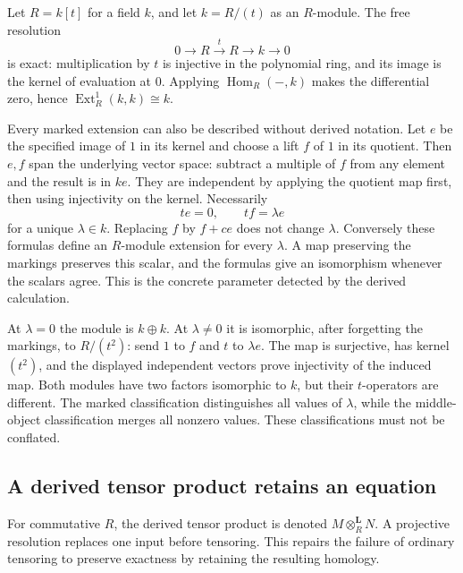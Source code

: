 \begin{example}
\label{t:dual-number-extension}
Let $R=k[t]$ for a field $k$, and let $k=R/(t)$ as an $R$-module.
The free resolution
\[
 0\longrightarrow R\xrightarrow{\,t\,}R\longrightarrow k
 \longrightarrow0
\]
is exact: multiplication by $t$ is injective in the polynomial ring,
and its image is the kernel of evaluation at $0$.  Applying
$\operatorname{Hom}_R(-,k)$ makes the differential zero, hence
$\operatorname{Ext}^1_R(k,k)\cong k$.

Every marked extension can also be described without derived notation.
Let $e$ be the specified image of $1$ in its kernel and choose a lift $f$
of $1$ in its quotient.  Then $e,f$ span the underlying vector space:
subtract a multiple of $f$ from any element and the result is in $ke$.
They are independent by applying the quotient map first, then using
injectivity on the kernel.  Necessarily
\[
 te=0,\qquad tf=\lambda e
\]
for a unique $\lambda\in k$.  Replacing $f$ by $f+ce$ does not change
$\lambda$.  Conversely these formulas define an $R$-module extension
for every $\lambda$.  A map preserving the markings preserves this
scalar, and the formulas give an isomorphism whenever the scalars agree.
This is the concrete parameter detected by the derived calculation.

At $\lambda=0$ the module is $k\oplus k$.  At $\lambda\neq0$ it is
isomorphic, after forgetting the markings, to $R/(t^2)$: send $1$ to
$f$ and $t$ to $\lambda e$.  The map is surjective, has kernel $(t^2)$,
and the displayed independent vectors prove injectivity of the induced
map.  Both modules have two factors isomorphic to $k$, but their
$t$-operators are different.  The marked classification distinguishes
all values of $\lambda$, while the middle-object classification merges
all nonzero values.  These classifications must not be conflated.
\end{example}

\subsection{A derived tensor product retains an equation}

For commutative $R$, the derived tensor product is denoted
$M\otimes_R^{\mathbf L}N$.  A projective resolution replaces one input
before tensoring.  This repairs the failure of ordinary tensoring to
preserve exactness by retaining the resulting homology.

